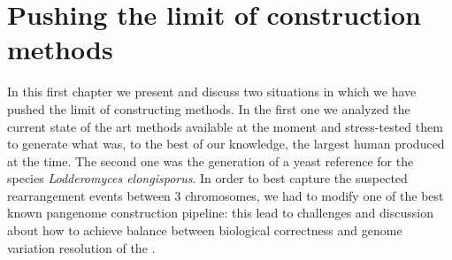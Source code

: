 \chapter{Pushing the limit of \pangenome construction methods}
\label{sec:pushing}
In this first chapter we present and discuss two situations in which we have pushed the limit of \pangenome constructing methods. In the first one we analyzed the current state of the art methods available at the moment and stress-tested them to generate what was, to the best of our knowledge, the largest human \pangenome produced at the time. The second one was the generation of a yeast \pangenome reference for the species \emph{Lodderomyces elongisporus}. In order to best capture the suspected rearrangement events between 3 chromosomes, we had to modify one of the best known pangenome construction pipeline: this lead to challenges and discussion about how to achieve balance between biological correctness and genome variation resolution of the \pangenome.

